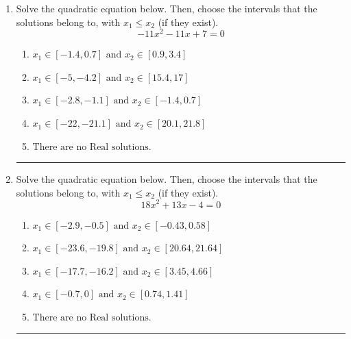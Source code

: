 \documentclass[14pt]{extbook}
\newcommand{\litem}[1]{\item#1\hspace*{-1cm}\rule{\textwidth}{0.4pt}}
\begin{document}
\begin{enumerate}
{\begin{enumerate}[label=\Alph*.]
\end{enumerate} }
\litem{
Solve the quadratic equation below. Then, choose the intervals that the solutions belong to, with $x_1 \leq x_2$ (if they exist).\[ -11x^{2} -11 x + 7 = 0 \]\begin{enumerate}[label=\Alph*.]
\item \( x_1 \in [-1.4, 0.7] \text{ and } x_2 \in [0.9, 3.4] \)
\item \( x_1 \in [-5, -4.2] \text{ and } x_2 \in [15.4, 17] \)
\item \( x_1 \in [-2.8, -1.1] \text{ and } x_2 \in [-1.4, 0.7] \)
\item \( x_1 \in [-22, -21.1] \text{ and } x_2 \in [20.1, 21.8] \)
\item \( \text{There are no Real solutions.} \)

\end{enumerate} }
\litem{
Solve the quadratic equation below. Then, choose the intervals that the solutions belong to, with $x_1 \leq x_2$ (if they exist).\[ 18x^{2} +13 x -4 = 0 \]\begin{enumerate}[label=\Alph*.]
\item \( x_1 \in [-2.9, -0.5] \text{ and } x_2 \in [-0.43, 0.58] \)
\item \( x_1 \in [-23.6, -19.8] \text{ and } x_2 \in [20.64, 21.64] \)
\item \( x_1 \in [-17.7, -16.2] \text{ and } x_2 \in [3.45, 4.66] \)
\item \( x_1 \in [-0.7, 0] \text{ and } x_2 \in [0.74, 1.41] \)
\item \( \text{There are no Real solutions.} \)


\end{enumerate}}
\end{enumerate}
\end{document}

